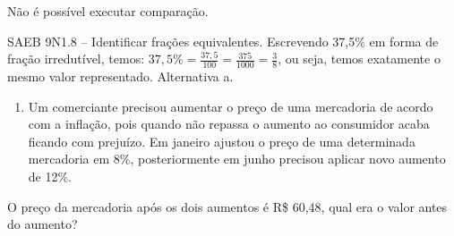 \begin{escolha}
\begin{boxmedio}
\begin{boxmedio}
{\begin{boxpeq}
\begin{boxpeq}
{\begin{boxpeq}
\begin{boxmedio}
\begin{boxmedio}
\begin{boxpeq}
\begin{boxmedio}
\begin{boxpeq}
\begin{boxpeq}
\begin{boxpeq}
\begin{boxpeq}
\begin{boxmedio}
{\begin{boxmedio}
\begin{boxmedio}
\begin{boxpeq}
\begin{boxmedio}
\begin{boxpeq}
\begin{boxpeq}
\begin{boxpeq}
\begin{escolha}
{\begin{boxmedio}
\begin{boxpeq}
\begin{boxpeq}
\begin{boxpeq}
\begin{boxpeq}
\begin{boxpeq}
\begin{boxmedio}
\begin{boxpeq}
\begin{boxpeq}
\begin{boxpeq}
{\begin{boxpeq}
\begin{boxmedio}
\begin{boxpeq}
\begin{boxpeq}
\begin{boxpeq}
{\begin{boxpeq}
\begin{boxmedio}
{\begin{boxpeq}
\begin{boxpeq}
\begin{boxmedio}
\begin{boxmedio}
\begin{boxpeq}
\begin{boxpeq}
{\begin{boxpeq}
\begin{boxpeq}
\begin{boxpeq}
\begin{boxpeq}
\begin{boxpeq}
\begin{escolha}
\begin{escolha}
{\begin{boxmedio}
\begin{boxpeq}
\begin{q°}
\begin{boxmedio}
\begin{boxpeq}
\begin{boxpeq}
\begin{boxmedio}
\begin{boxmedio}
\begin{boxmedio}
\begin{boxmedio}
{\begin{escolha}
\begin{escolha}
\begin{escolha}
\begin{escolha}
\begin{escolha}
\begin{escolha}
{\begin{enumerate}
  Não é possível executar comparação.
\end{enumerate}

SAEB 9N1.8 -- Identificar frações equivalentes. Escrevendo 37,5\% em
forma de fração irredutível, temos:
$37,5\% = \frac{37,5}{100} = \frac{375}{1000} = \frac{3}{8}$, ou seja,
temos exatamente o mesmo valor representado. Alternativa a.

\begin{enumerate}
\num{\arabic{enumi}.}
\setcounter{enumi}{3}
\tightlist
\item
  Um comerciante precisou aumentar o preço de uma mercadoria de acordo
  com a inflação, pois quando não repassa o aumento ao consumidor acaba
  ficando com prejuízo. Em janeiro ajustou o preço de uma determinada
  mercadoria em 8\%, posteriormente em junho precisou aplicar novo
  aumento de 12\%.
\end{enumerate}

O preço da mercadoria após os dois aumentos é R\$ 60,48, qual era o
valor antes do aumento?

\begin{enumerate}


\end{enumerate}}
\end{escolha}
\end{escolha}
\end{escolha}
\end{escolha}
\end{escolha}
\end{escolha}}
\end{boxmedio}
\end{boxmedio}
\end{boxmedio}
\end{boxmedio}
\end{boxpeq}
\end{boxpeq}
\end{boxmedio}
\end{q°}
\end{boxpeq}
\end{boxmedio}}
\end{escolha}
\end{escolha}
\end{boxpeq}
\end{boxpeq}
\end{boxpeq}
\end{boxpeq}
\end{boxpeq}}
\end{boxpeq}
\end{boxpeq}
\end{boxmedio}
\end{boxmedio}
\end{boxpeq}
\end{boxpeq}}
\end{boxmedio}
\end{boxpeq}}
\end{boxpeq}
\end{boxpeq}
\end{boxpeq}
\end{boxmedio}
\end{boxpeq}}
\end{boxpeq}
\end{boxpeq}
\end{boxpeq}
\end{boxmedio}
\end{boxpeq}
\end{boxpeq}
\end{boxpeq}
\end{boxpeq}
\end{boxpeq}
\end{boxmedio}}
\end{escolha}
\end{boxpeq}
\end{boxpeq}
\end{boxpeq}
\end{boxmedio}
\end{boxpeq}
\end{boxmedio}
\end{boxmedio}}
\end{boxmedio}
\end{boxpeq}
\end{boxpeq}
\end{boxpeq}
\end{boxpeq}
\end{boxmedio}
\end{boxpeq}
\end{boxmedio}
\end{boxmedio}
\end{boxpeq}}
\end{boxpeq}
\end{boxpeq}}
\end{boxmedio}
\end{boxmedio}
\end{escolha}
